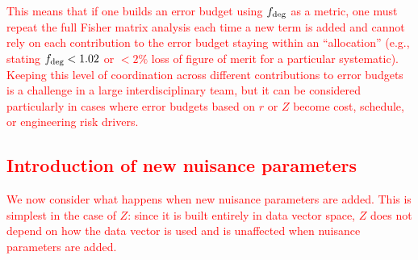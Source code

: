 \documentclass[usenatbib]{mnras}
\newcommand{\changetext}[1]{\textcolor{red}{#1}}
\begin{document}
\changetext{This means that if one builds an error budget using $f_{\rm deg}$ as a metric, one must repeat the full Fisher matrix analysis each time a new term is added and cannot rely on each contribution to the error budget staying within an ``allocation'' (e.g., stating $f_{\rm deg} < 1.02$ or $<2\%$ loss of figure of merit for a particular systematic). Keeping this level of coordination across different contributions to error budgets is a challenge in a large interdisciplinary team, but it can be considered particularly in cases where error budgets based on $r$ or $Z$ become cost, schedule, or engineering risk drivers.}

\subsection{\changetext{Introduction of new nuisance parameters}}
\label{ss:app-nuisance}

\changetext{We now consider what happens when new nuisance parameters are added. This is simplest in the case of $Z$: since it is built entirely in data vector space, $Z$ does not depend on how the data vector is used and is unaffected when nuisance parameters are added.}
\end{document}
